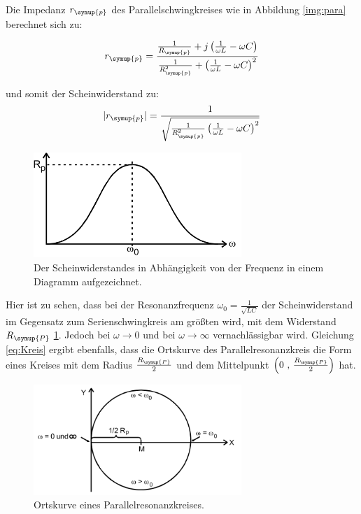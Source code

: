         \noindent Die Impedanz $r_{\symup{p}}$ des Parallelschwingkreises wie in Abbildung \ref{img:para} berechnet sich zu:
        
    \begin{equation}
        r_{\symup{p}} = \frac{\frac{1}{R_{\symup{p}}}+j \left( \frac{1}{\omega L} - \omega C \right)}{\frac{1}{R^2_{\symup{p}}}+ \left( \frac{1}{\omega L} - \omega C \right)^2}
        \label{eq:Kreis}
    \end{equation}

    \noindent und somit der Scheinwiderstand zu:
    \begin{equation}
        |r_{\symup{p}}|=  \frac{1}{\sqrt{\frac{1}{R^2_{\symup{p}}} \left( \frac{1}{\omega L} - \omega C \right)^2}} \nonumber
    \end{equation}

    \begin{figure}[H]
        \centering
        \includegraphics[width=0.7\textwidth]{images/Scheinwiderstand.PNG}
        \caption{Der Scheinwiderstandes in Abhängigkeit von der Frequenz in einem Diagramm aufgezeichnet.}
        \label{img:scheinw}
    \end{figure}

    \noindent Hier ist zu sehen, dass bei der Resonanzfrequenz $\omega_0 = \frac{1}{\sqrt{LC}}$ der Scheinwiderstand im Gegensatz zum 
    Serienschwingkreis am größten wird, mit dem Widerstand $R_{\symup{P}}$ \ref{img:scheinw}. Jedoch bei $\omega \to 0$ und bei $\omega \to \infty$ 
    vernachlässigbar wird. Gleichung \ref{eq:Kreis} ergibt ebenfalls, dass die Ortskurve des Parallelresonanzkreis die Form eines Kreises 
    mit dem Radius $\frac{R_{\symup{P}}}{2}$ und dem Mittelpunkt $\left( \text{0 , } \frac{R_{\symup{P}}}{2} \right)$ hat.

    
    \begin{figure}[H]
        \centering
        \includegraphics[width=0.7\textwidth]{images/Ortskurve.PNG}
        \caption{Ortskurve eines Parallelresonanzkreises.}
        \label{img:orts}
    \end{figure}
